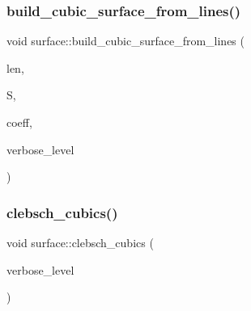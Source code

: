 \mbox{\label{classsurface_a95e15e44b3f97a1d83b878b31751a0a2}} 
\subsubsection{\texorpdfstring{build\+\_\+cubic\+\_\+surface\+\_\+from\+\_\+lines()}{build\_cubic\_surface\_from\_lines()}}
{\footnotesize\ttfamily void surface\+::build\+\_\+cubic\+\_\+surface\+\_\+from\+\_\+lines (\begin{DoxyParamCaption}\item[{\mbox{\hyperlink{galois_8h_a09fddde158a3a20bd2dcadb609de11dc}{I\+NT}}}]{len,  }\item[{\mbox{\hyperlink{galois_8h_a09fddde158a3a20bd2dcadb609de11dc}{I\+NT}} $\ast$}]{S,  }\item[{\mbox{\hyperlink{galois_8h_a09fddde158a3a20bd2dcadb609de11dc}{I\+NT}} $\ast$}]{coeff,  }\item[{\mbox{\hyperlink{galois_8h_a09fddde158a3a20bd2dcadb609de11dc}{I\+NT}}}]{verbose\+\_\+level }\end{DoxyParamCaption})}

\mbox{\label{classsurface_aac49a34b771fffc48f3650861c3684ab}} 
\subsubsection{\texorpdfstring{clebsch\+\_\+cubics()}{clebsch\_cubics()}}
{\footnotesize\ttfamily void surface\+::clebsch\+\_\+cubics (\begin{DoxyParamCaption}\item[{\mbox{\hyperlink{galois_8h_a09fddde158a3a20bd2dcadb609de11dc}{I\+NT}}}]{verbose\+\_\+level }\end{DoxyParamCaption})}

\mbox{\label{classsurface_ab69c3741436f4346b54e86e5d65118ca}} 
